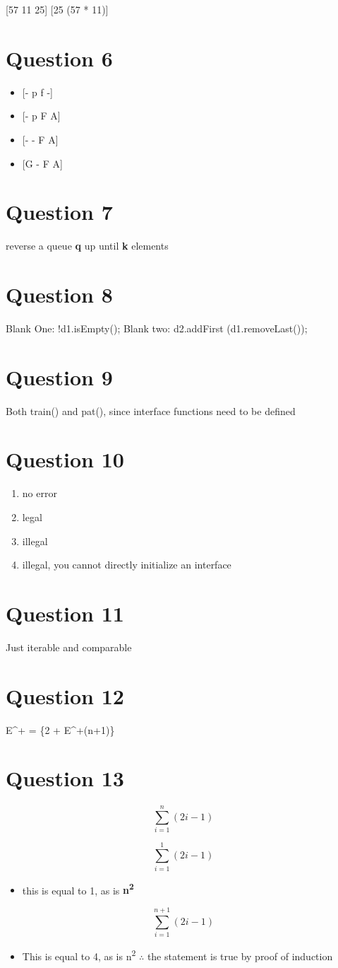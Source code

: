 \documentclass[11pt]{article}
\begin{document}
{[}57 11 25]
{[}25 (57 * 11)]
\section{Question 6}
\label{sec:org622d288}
\begin{itemize}
\item {[}- p f -]
\item {[}- p F A]
\item {[}- - F A]
\item {[}G - F A]
\end{itemize}
\section{Question 7}
\label{sec:org1e5b261}
reverse a queue \textbf{q} up until \textbf{k} elements
\section{Question 8}
\label{sec:orgde43916}
Blank One: !d1.isEmpty();
Blank two: d2.addFirst (d1.removeLast());
\section{Question 9}
\label{sec:orgf807584}
Both train() and pat(), since interface functions need to be defined
\section{Question 10}
\label{sec:org12f1254}
\begin{enumerate}
\item no error
\item legal
\item illegal
\item illegal, you cannot directly initialize an interface
\end{enumerate}
\section{Question 11}
\label{sec:org71d6bb8}
Just iterable and comparable
\section{Question 12}
\label{sec:orgf925e83}
E\^{}+ = \{2 + E\^{}+(n+1)\}
\section{Question 13}
\label{sec:org0e8155a}
\[
\sum_{i=1}^{n} (2i - 1)
\]

\[
\sum_{i=1}^{1} (2i - 1)
\]

\begin{itemize}
\item this is equal to 1, as is \textbf{n\textsuperscript{2}}
\end{itemize}

\[
\sum_{i=1}^{n+1} (2i - 1)
\]

\begin{itemize}
\item This is equal to 4, as is n\textsuperscript{2} \(\therefore\) the statement is true by proof of induction
\end{itemize}
\end{document}
